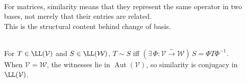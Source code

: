 \begin{perspective} \\
For matrices, similarity means that they represent the same operator in two bases, not merely that their entries are related.\\
This is the structural content behind change of basis.
\end{perspective}

\begin{definition} \label{def:similar-linear-operators} \\
For $T\in\LL(\mathcal{V})$ and $S\in\LL(\mathcal{W})$, $T\sim S$ iff $(\exists\,\Phi:\mathcal{V}\xrightarrow{\sim}\mathcal{W})\,S=\Phi T\Phi^{-1}$.\\
When $\mathcal{V}=\mathcal{W}$, the witnesses lie in $\operatorname{Aut}(\mathcal{V})$, so similarity is conjugacy in $\LL(\mathcal{V})$.
\end{definition}

